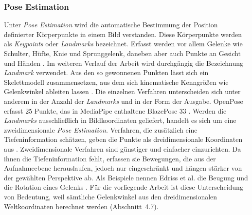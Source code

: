 \documentclass[intern]{cgMA}
\begin{document}
\subsubsection{Pose Estimation}
Unter \textit{Pose Estimation} wird die automatische Bestimmung der Position definierter Körperpunkte in einem Bild verstanden. Diese Körperpunkte werden als \textit{Keypoints} oder \textit{Landmarks} bezeichnet. Erfasst werden vor allem Gelenke wie Schulter, Hüfte, Knie und Sprunggelenk, daneben aber auch Punkte an Gesicht und Händen \cite{Edriss2025}. Im weiteren Verlauf der Arbeit wird durchgängig die Bezeichnung \textit{Landmark} verwendet. Aus den so gewonnenen Punkten lässt sich ein Skelettmodell zusammensetzen, aus dem sich kinematische Kenngrößen wie Gelenkwinkel ableiten lassen \cite{Edriss2025}.
Die einzelnen Verfahren unterscheiden sich unter anderem in der Anzahl der \textit{Landmarks} und in der Form der Ausgabe. OpenPose erfasst 25 Punkte, das in MediaPipe enthaltene BlazePose 33 \cite{Edriss2025}. Werden die \textit{Landmarks} ausschließlich in Bildkoordinaten geliefert, handelt es sich um eine zweidimensionale \textit{Pose Estimation}. Verfahren, die zusätzlich eine Tiefeninformation schätzen, geben die Punkte als dreidimensionale Koordinaten aus \cite{Edriss2025}. Zweidimensionale Verfahren sind günstiger und einfacher einzurichten. Da ihnen die Tiefeninformation fehlt, erfassen sie Bewegungen, die aus der Aufnahmeebene herauslaufen, jedoch nur eingeschränkt und hängen stärker von der gewählten Perspektive ab. Als Beispiele nennen Edriss et al. \cite{Edriss2025} die Beugung und die Rotation eines Gelenks \cite{Edriss2025}. Für die vorliegende Arbeit ist diese Unterscheidung von Bedeutung, weil sämtliche Gelenkwinkel aus den dreidimensionalen Weltkoordinaten berechnet werden (Abschnitt~4.7).
\end{document}

